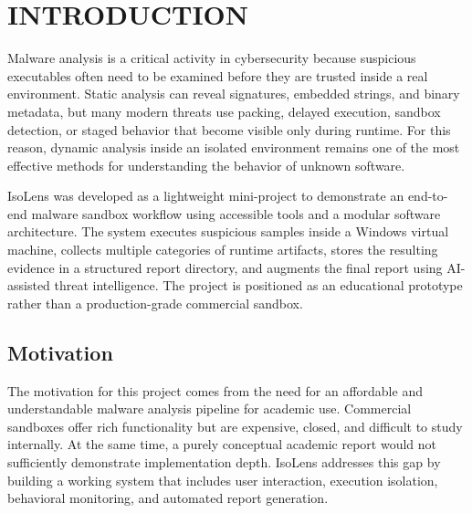 \documentclass[a4paper,12pt,oneside]{report}
\newcommand{\changefont}{%
\fontsize{10}{12}\selectfont
}
\begin{document}
\newpage


\newpage
\renewcommand\thepage{\arabic{page}}
\clearpage
\setlength{\headheight}{15pt}
\pagestyle{fancy}
\fancyhf{}
\lhead{\changefont\thechapter.\leftmark}
\rhead{}
\cfoot{\thepage}
\renewcommand{\chaptermark}[1]{\markboth{#1}{}}
\renewcommand{\sectionmark}[1]{\markright{#1}{}}
\renewcommand{\headrulewidth}{0.5pt}
\setcounter{page}{1}

\chapter{INTRODUCTION}
\noindent
Malware analysis is a critical activity in cybersecurity because suspicious executables often need to be examined before they are trusted inside a real environment. Static analysis can reveal signatures, embedded strings, and binary metadata, but many modern threats use packing, delayed execution, sandbox detection, or staged behavior that become visible only during runtime. For this reason, dynamic analysis inside an isolated environment remains one of the most effective methods for understanding the behavior of unknown software.

\par

\par

IsoLens was developed as a lightweight mini-project to demonstrate an end-to-end malware sandbox workflow using accessible tools and a modular software architecture. The system executes suspicious samples inside a Windows virtual machine, collects multiple categories of runtime artifacts, stores the resulting evidence in a structured report directory, and augments the final report using AI-assisted threat intelligence. The project is positioned as an educational prototype rather than a production-grade commercial sandbox.

\section{Motivation}
\noindent
The motivation for this project comes from the need for an affordable and understandable malware analysis pipeline for academic use. Commercial sandboxes offer rich functionality but are expensive, closed, and difficult to study internally. At the same time, a purely conceptual academic report would not sufficiently demonstrate implementation depth. IsoLens addresses this gap by building a working system that includes user interaction, execution isolation, behavioral monitoring, and automated report generation.
\end{document}
